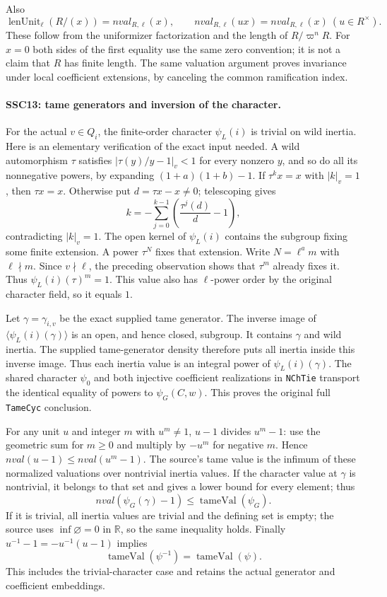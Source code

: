 Also
\[
 \operatorname{lenUnit}_{\ell}(R/(x))
       = nval_{R,\ell}(x),\qquad
 nval_{R,\ell}(ux)=nval_{R,\ell}(x)\ (u\in R^\times).         \tag{SSC.18}
\]
These follow from the uniformizer factorization and the length of
$R/\varpi^nR$. For $x=0$ both sides of the first equality use the
same zero convention; it is not a claim that $R$ has finite length.
The same valuation argument proves invariance under local
coefficient extensions, by canceling the common ramification index.

\paragraph{SSC13: tame generators and inversion of the character.}
\label{claim:SSC13}
For the actual $v\in Q_i$, the finite-order character $\psi_L(i)$
is trivial on wild inertia. Here is an elementary verification of
the exact input needed. A wild automorphism $\tau$ satisfies
$|\tau(y)/y-1|_v<1$ for every nonzero $y$, and so do all its
nonnegative powers, by expanding $(1+a)(1+b)-1$.
If $\tau^k x=x$ with $|k|_v=1$, then $\tau x=x$. Otherwise put
$d=\tau x-x\ne0$; telescoping gives
\[
 k=-\sum_{j=0}^{k-1}\left(\frac{\tau^j(d)}d-1\right),
\]
contradicting $|k|_v=1$. The open kernel of $\psi_L(i)$ contains
the subgroup fixing some finite extension. A power $\tau^N$
fixes that extension. Write $N=\ell^a m$ with $\ell\nmid m$.
Since $v\nmid\ell$, the preceding observation shows that
$\tau^m$ already fixes it. Thus $\psi_L(i)(\tau)^m=1$.
This value also has $\ell$-power order by the original character
field, so it equals $1$.

Let $\gamma=\gamma_{i,v}$ be the exact supplied tame generator.
The inverse image of $\langle\psi_L(i)(\gamma)\rangle$ is an open,
and hence closed, subgroup. It contains $\gamma$ and wild inertia.
The supplied tame-generator density therefore puts all inertia
inside this inverse image. Thus each inertia value is an integral
power of $\psi_L(i)(\gamma)$. The shared character $\psi_0$
and both injective coefficient realizations in \texttt{NChTie}
transport the identical equality of powers to $\psi_G(C,w)$.
This proves the original full \texttt{TameCyc} conclusion.

For any unit $u$ and integer $m$ with $u^m\ne1$, $u-1$ divides
$u^m-1$: use the geometric sum for $m\ge0$ and multiply by
$-u^m$ for negative $m$. Hence
$nval(u-1)\le nval(u^m-1)$. The source's tame value is the
infimum of these normalized valuations over nontrivial inertia
values. If the character value at $\gamma$ is nontrivial, it
belongs to that set and gives a lower bound for every element;
thus
\[
 nval(\psi_G(\gamma)-1)\le\operatorname{tameVal}(\psi_G).
                                                                    \tag{SSC.19}
\]
If it is trivial, all inertia values are trivial and the defining
set is empty; the source uses $\inf\varnothing=0$ in $\mathbb R$,
so the same inequality holds. Finally
$u^{-1}-1=-u^{-1}(u-1)$ implies
\[
           \operatorname{tameVal}(\psi^{-1})
                     =\operatorname{tameVal}(\psi).           \tag{SSC.20}
\]
This includes the trivial-character case and retains the actual
generator and coefficient embeddings.

